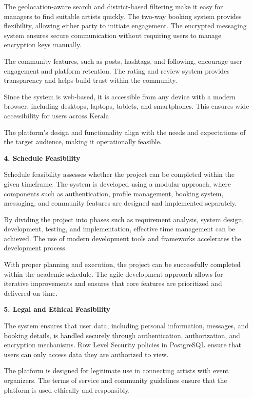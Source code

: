 \documentclass[12pt,a4paper]{report}
\begin{document}
The geolocation-aware search and district-based filtering make it easy for managers to find suitable artists quickly. The two-way booking system provides flexibility, allowing either party to initiate engagement. The encrypted messaging system ensures secure communication without requiring users to manage encryption keys manually.

The community features, such as posts, hashtags, and following, encourage user engagement and platform retention. The rating and review system provides transparency and helps build trust within the community.

Since the system is web-based, it is accessible from any device with a modern browser, including desktops, laptops, tablets, and smartphones. This ensures wide accessibility for users across Kerala.

The platform's design and functionality align with the needs and expectations of the target audience, making it operationally feasible.

\textbf{4. Schedule Feasibility}

Schedule feasibility assesses whether the project can be completed within the given timeframe. The system is developed using a modular approach, where components such as authentication, profile management, booking system, messaging, and community features are designed and implemented separately.

By dividing the project into phases such as requirement analysis, system design, development, testing, and implementation, effective time management can be achieved. The use of modern development tools and frameworks accelerates the development process.

With proper planning and execution, the project can be successfully completed within the academic schedule. The agile development approach allows for iterative improvements and ensures that core features are prioritized and delivered on time.

\textbf{5. Legal and Ethical Feasibility}

The system ensures that user data, including personal information, messages, and booking details, is handled securely through authentication, authorization, and encryption mechanisms. Row Level Security policies in PostgreSQL ensure that users can only access data they are authorized to view.

The platform is designed for legitimate use in connecting artists with event organizers. The terms of service and community guidelines ensure that the platform is used ethically and responsibly.
\end{document}

